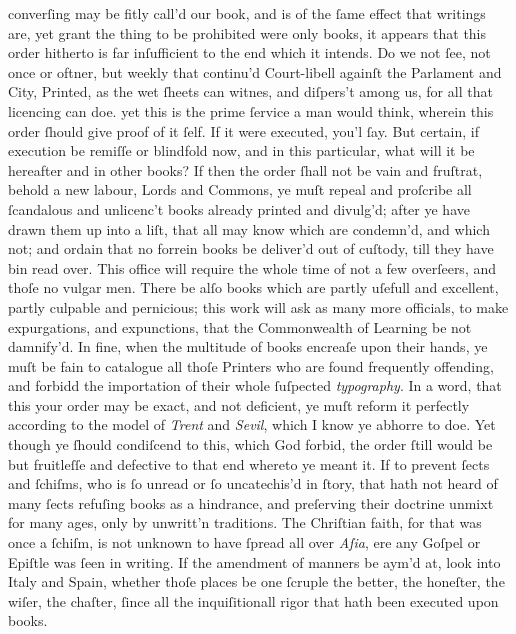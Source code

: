 converſing may be fitly call'd our book, and is of the ſame effect that writings
are, yet grant the thing to be prohibited were only books, it appears that this
order hitherto is far inſufficient to the end which it intends.  Do we not ſee,
not once or oftner, but weekly that continu'd Court-libell againſt the Parlament
and City, Printed, as the wet ſheets can witnes, and diſpers't among us, for all
that licencing can doe.  yet this is the prime ſervice a man would think,
wherein this order ſhould give proof of it ſelf.  If it were executed, you'l
ſay.  But certain, if execution be remiſſe or blindfold now, and in this
particular, what will it be hereafter and in other books?  If then the order
ſhall not be vain and fruſtrat, behold a new labour, Lords and Commons, ye muſt
repeal and proſcribe all ſcandalous and unlicenc't books already printed and
divulg'd; after ye have drawn them up into a liſt, that all may know which are
condemn'd, and which not; and ordain that no forrein books be deliver'd out of
cuſtody, till they have bin read over.  This office will require the whole time
of not a few overſeers, and thoſe no vulgar men.  There be alſo books which are
partly uſefull and excellent, partly culpable and pernicious; this work will ask
as many more officials, to make expurgations, and expunctions, that the
Commonwealth of Learning be not damnify'd.  In fine, when the multitude of books
encreaſe upon their hands, ye muſt be fain to catalogue all thoſe Printers who
are found frequently offending, and forbidd the importation of their whole
ſuſpected \textit{typography}.  In a word, that this your order may be exact,
and not deficient, ye muſt reform it perfectly according to the model of
\textit{Trent} and \textit{Sevil}, which I know ye abhorre to doe.  Yet though
ye ſhould condiſcend to this, which God forbid, the order ſtill would be but
fruitleſſe and defective to that end whereto ye meant it.  If to prevent ſects
and ſchiſms, who is ſo unread or ſo uncatechis'd in ſtory, that hath not heard
of many ſects refuſing books as a hindrance, and preſerving their doctrine
unmixt for many ages, only by unwritt'n traditions.  The Chriſtian faith, for
that was once a ſchiſm, is not unknown to have ſpread all over \textit{Aſia},
ere any Goſpel or Epiſtle was ſeen in writing.  If the amendment of manners be
aym'd at, look into Italy and Spain, whether thoſe places be one ſcruple the
better, the honeſter, the wiſer, the chaſter, ſince all the inquiſitionall rigor
that hath been executed upon books.

